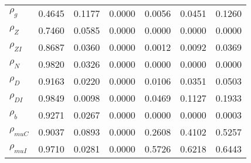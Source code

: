 \begin{center}
\begin{longtable}{lcccccc}
$ {\rho_g}             $	 & 	          0.4645	 & 	          0.1177	 & 	          0.0000	 & 	          0.0056	 & 	          0.0451	 & 	          0.1260 \\ 
$ {\rho_Z}             $	 & 	          0.7460	 & 	          0.0585	 & 	          0.0000	 & 	          0.0000	 & 	          0.0000	 & 	          0.0000 \\ 
$ {\rho_{ZI}}          $	 & 	          0.8687	 & 	          0.0360	 & 	          0.0000	 & 	          0.0012	 & 	          0.0092	 & 	          0.0369 \\ 
$ {\rho_N}             $	 & 	          0.9820	 & 	          0.0326	 & 	          0.0000	 & 	          0.0000	 & 	          0.0000	 & 	          0.0000 \\ 
$ {\rho_D}             $	 & 	          0.9163	 & 	          0.0220	 & 	          0.0000	 & 	          0.0106	 & 	          0.0351	 & 	          0.0503 \\ 
$ {\rho_{DI}}          $	 & 	          0.9849	 & 	          0.0098	 & 	          0.0000	 & 	          0.0469	 & 	          0.1127	 & 	          0.1933 \\ 
$ {\rho_b}             $	 & 	          0.9271	 & 	          0.0267	 & 	          0.0000	 & 	          0.0000	 & 	          0.0000	 & 	          0.0003 \\ 
$ {\rho_{muC}}         $	 & 	          0.9037	 & 	          0.0893	 & 	          0.0000	 & 	          0.2608	 & 	          0.4102	 & 	          0.5257 \\ 
$ {\rho_{muI}}         $	 & 	          0.9710	 & 	          0.0281	 & 	          0.0000	 & 	          0.5726	 & 	          0.6218	 & 	          0.6443 \\ 
\end{longtable}
 \end{center}
